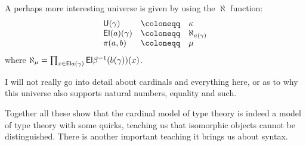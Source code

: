A perhaps more interesting universe is given by using the \(\aleph\) function:
\[
  \begin{array}{lcl}
    \CU(\gamma) &\coloneqq& \kappa \\
    \CEl(a)(\gamma) &\coloneqq& \aleph_{a(\gamma)} \\
    \pi(a,b) &\coloneqq& \mu
  \end{array}
\]
where
\(\aleph_\mu = \prod_{x \in \mathsf{El}{a(\gamma)}} \mathsf{El}{\beta^{-1}(b(\gamma))(x)}\).

I will not really go into detail about cardinals and everything here, or as to
why this universe also supports natural numbers, equality and such.


Together all these show that the cardinal model of type theory is indeed a model
of type theory with some quirks, teaching us that isomorphic objects cannot be
distinguished.
There is another important teaching it brings us about syntax.

